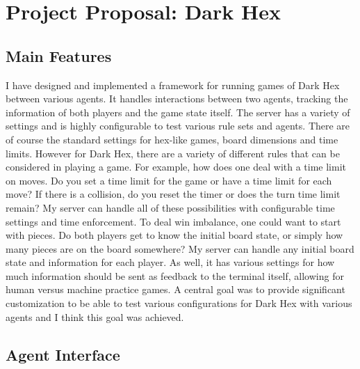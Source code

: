 \documentclass[11pt]{article}
\begin{document}
\section*{Project Proposal: Dark Hex}

\subsection*{Main Features}

I have designed and implemented a framework for running games of Dark Hex between various agents.
It handles interactions between two agents, tracking the information of both players and the game state itself.
The server has a variety of settings and is highly configurable to test various rule sets and agents.
There are of course the standard settings for hex-like games, board dimensions and time limits.
However for Dark Hex, there are a variety of different rules that can be considered in playing a game.
For example, how does one deal with a time limit on moves.
Do you set a time limit for the game or have a time limit for each move?
If there is a collision, do you reset the timer or does the turn time limit remain?
My server can handle all of these possibilities with configurable time settings and time enforcement.
To deal win imbalance, one could want to start with pieces.
Do both players get to know the initial board state, or simply how many pieces are on the board somewhere?
My server can handle any initial board state and information for each player.
As well, it has various settings for how much information should be sent as feedback to the terminal itself, allowing for human versus machine practice games.
A central goal was to provide significant customization to be able to test various configurations for Dark Hex with various agents and I think this goal was achieved.

\subsection*{Agent Interface}
\end{document}
